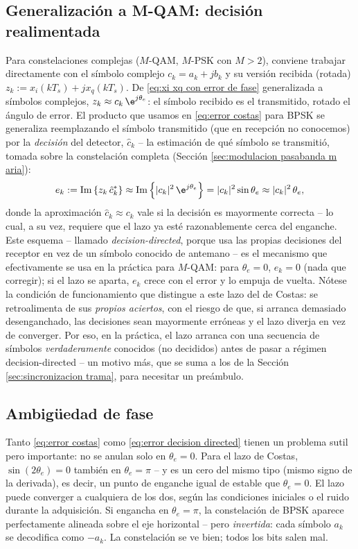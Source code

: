 \subsection*{Generalización a M-QAM: decisión realimentada}

Para constelaciones complejas ($M$-QAM, $M$-PSK con $M>2$), conviene trabajar directamente con el símbolo complejo $c_k=a_k+jb_k$ y su versión recibida (rotada) $z_k := x_i(kT_s)+jx_q(kT_s)$. De \eqref{eq:xi xq con error de fase} generalizada a símbolos complejos, $z_k \approx c_k\,\e^{j\theta_e}$: el símbolo recibido es el transmitido, rotado el ángulo de error. El producto que usamos en \eqref{eq:error costas} para BPSK se generaliza reemplazando el símbolo transmitido (que en recepción no conocemos) por la \emph{decisión} del detector, $\hat c_k$ -- la estimación de qué símbolo se transmitió, tomada sobre la constelación completa (Sección \ref{sec:modulacion pasabanda m aria}):
\begin{equation}\label{eq:error decision directed}
    e_k := \mathrm{Im}\left\{z_k\, \hat c_k^*\right\} \approx \mathrm{Im}\left\{|c_k|^2\, \e^{j\theta_e}\right\} = |c_k|^2\sin\theta_e \approx |c_k|^2\,\theta_e,
\end{equation}
donde la aproximación $\hat c_k\approx c_k$ vale si la decisión es mayormente correcta -- lo cual, a su vez, requiere que el lazo ya esté razonablemente cerca del enganche. Este esquema -- llamado \emph{decision-directed}, porque usa las propias decisiones del receptor en vez de un símbolo conocido de antemano -- es el mecanismo que efectivamente se usa en la práctica para $M$-QAM: para $\theta_e=0$, $e_k=0$ (nada que corregir); si el lazo se aparta, $e_k$ crece con el error y lo empuja de vuelta. Nótese la condición de funcionamiento que distingue a este lazo del de Costas: se retroalimenta de sus \emph{propios aciertos}, con el riesgo de que, si arranca demasiado desenganchado, las decisiones sean mayormente erróneas y el lazo diverja en vez de converger. Por eso, en la práctica, el lazo arranca con una secuencia de símbolos \emph{verdaderamente} conocidos (no decididos) antes de pasar a régimen decision-directed -- un motivo más, que se suma a los de la Sección \ref{sec:sincronizacion trama}, para necesitar un preámbulo.

\subsection*{Ambigüedad de fase}

Tanto \eqref{eq:error costas} como \eqref{eq:error decision directed} tienen un problema sutil pero importante: no se anulan solo en $\theta_e=0$. Para el lazo de Costas, $\sin(2\theta_e)=0$ también en $\theta_e=\pi$ -- y es un cero del mismo tipo (mismo signo de la derivada), es decir, un punto de enganche igual de estable que $\theta_e=0$. El lazo puede converger a cualquiera de los dos, según las condiciones iniciales o el ruido durante la adquisición. Si engancha en $\theta_e=\pi$, la constelación de BPSK aparece perfectamente alineada sobre el eje horizontal -- pero \emph{invertida}: cada símbolo $a_k$ se decodifica como $-a_k$. La constelación se ve bien; todos los bits salen mal.


